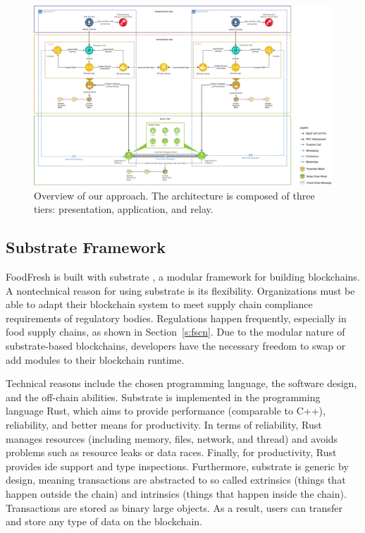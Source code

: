\documentclass[conference]{IEEEtran}
\begin{document}
\begin{figure}[h]
	\centering
	\includegraphics[width=\linewidth]{tiers_overview}
	\caption{Overview of our approach. The architecture is composed of three tiers: presentation, application, and relay. }
	\label{fig:system_architecture}
\end{figure}

\subsection{Substrate Framework} \label{substrate_framework}
FoodFresh is built with substrate \cite{substrateio}, a modular framework for building blockchains. A nontechnical reason for using substrate is its flexibility. Organizations must be able to adapt their blockchain system to meet supply chain compliance requirements of regulatory bodies. Regulations happen frequently, especially in food supply chains, as shown in Section~\ref{s:fscn}. Due to the modular nature of substrate-based blockchains, developers have the necessary freedom to swap or add modules to their blockchain runtime.

Technical reasons include the chosen programming language, the software design, and the off-chain abilities. Substrate is implemented in the programming language Rust, which aims to provide performance (comparable to C++), reliability, and better means for productivity. In terms of reliability, Rust manages resources (including memory, files, network, and thread) and avoids problems such as resource leaks or data races. Finally, for productivity, Rust provides \ac{ide} support and type inspections. Furthermore, substrate is generic by design, meaning transactions are abstracted to so called extrinsics (things that happen outside the chain) and intrinsics (things that happen inside the chain). Transactions are stored as binary large objects. As a result, users can transfer and store any type of data on the blockchain. 
\end{document}
